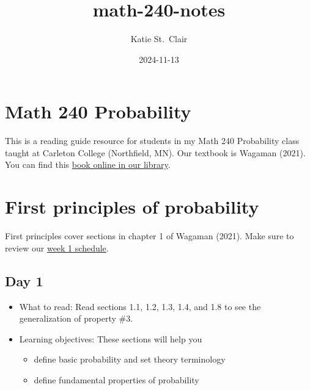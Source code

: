 \documentclass[
  letterpaper,
]{scrbook}
\title{math-240-notes}
\author{Katie St.~Clair}
\date{2024-11-13}
\providecommand{\tightlist}{%
  \setlength{\itemsep}{0pt}\setlength{\parskip}{0pt}}\usepackage{longtable,booktabs,array}
\renewcommand*\contentsname{Table of contents}
\newcommand\contentsname{Table of contents}
\begin{document}
\frontmatter
\maketitle

\renewcommand*\contentsname{Table of contents}
{
\setcounter{tocdepth}{2}
\tableofcontents
}

\mainmatter
{}

\chapter*{Math 240 Probability}\label{math-240-probability}


This is a reading guide resource for students in my Math 240 Probability
class taught at Carleton College (Northfield, MN). Our textbook is
Wagaman (2021). You can find this
\href{https://bridge.primo.exlibrisgroup.com/permalink/01BRC_INST/11mmqid/cdi_askewsholts_vlebooks_9781119692416}{book
online in our library}.


\chapter{First principles of probability}\label{sec-first-p}

First principles cover sections in chapter 1 of Wagaman (2021). Make
sure to review our
\href{https://docs.google.com/spreadsheets/d/1QKQFfuuDzFUpOdjMvmHWZpR6zUzoxd9UjE83vA0H1Fs/edit?usp=sharing}{week
1 schedule}.

\section*{Day 1}\label{day-1}


\begin{itemize}
\item
  What to read: Read sections 1.1, 1.2, 1.3, 1.4, and 1.8 to see the
  generalization of property \#3.
\item
  Learning objectives: These sections will help you

  \begin{itemize}
  \tightlist
  \item
    define basic probability and set theory terminology
  \item
    define fundamental properties of probability
  \end{itemize}
\end{itemize}
\end{document}
